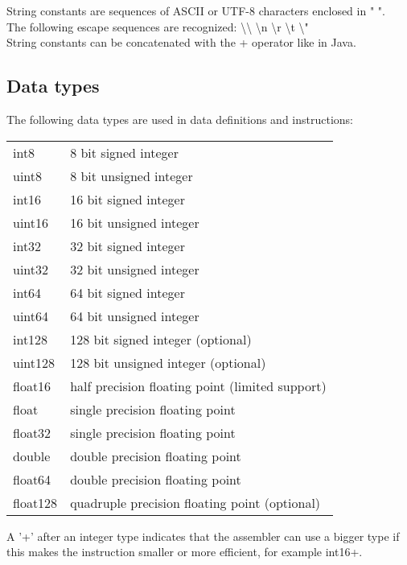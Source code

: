 \documentclass[forwardcom.tex]{subfiles}
\begin{document}
String constants are sequences of ASCII or UTF-8 characters enclosed in " ".\\
The following escape sequences are recognized: \textbackslash\textbackslash \hspace{1mm}
\textbackslash n \textbackslash r  \textbackslash t  \textbackslash " \\
String constants can be concatenated with the + operator like in Java.
\vspace{2mm}

\subsection{Data types} \label{assemblyDataTypes}
The following data types are used in data definitions and instructions:

\begin{tabular}{|p{15mm}p{125mm}|}
\hline
int8    & 8 bit signed integer\\
uint8   & 8 bit unsigned integer\\
int16   & 16 bit signed integer\\
uint16  & 16 bit unsigned integer\\
int32   & 32 bit signed integer\\
uint32  & 32 bit unsigned integer\\
int64   & 64 bit signed integer\\
uint64  & 64 bit unsigned integer\\
int128  & 128 bit signed integer (optional)\\
uint128 & 128 bit unsigned integer (optional)\\
float16 & half precision floating point (limited support)\\
float   & single precision floating point\\
float32 & single precision floating point\\
double  & double precision floating point\\
float64 & double precision floating point\\
float128 & quadruple precision floating point (optional)\\
\hline
\end{tabular}
\vspace{2mm}

A '+' after an integer type indicates that the assembler can use a bigger type if this makes
the instruction smaller or more efficient, for example int16+.
\vspace{2mm}
\end{document}
